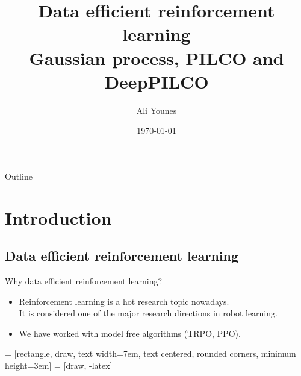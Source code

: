 \documentclass{beamer}
\title[Data efficient reinforcement learning]{Data efficient reinforcement learning\\Gaussian process, PILCO and DeepPILCO}
\author{Ali Younes}
\institute[BMSTU]
{
  Bauman Moscow State Technical University \\ %
  \medskip
  \textit{ay20-5-1994@hotmail.com} %
}
\date{\today}
\begin{document}
\begin{frame}
  \titlepage
\end{frame}

\begin{frame}{Outline}
  \tableofcontents
\end{frame}

\section{Introduction}
\subsection{Data efficient reinforcement learning}
\begin{frame}{Why data efficient reinforcement learning?}
\begin{itemize}
  \item Reinforcement learning is a hot research topic nowadays.\\
  It is considered one of the major research directions in robot learning.
  \item We have worked with model free algorithms (TRPO, PPO).
\end{itemize}
  \begin{center}
  \captionsetup{labelformat=empty}
     = [rectangle, draw, 
    text width=7em, text centered, rounded corners, minimum height=3em]
     = [draw, -latex]
\end{center}{}
\end{frame}
\end{document}

